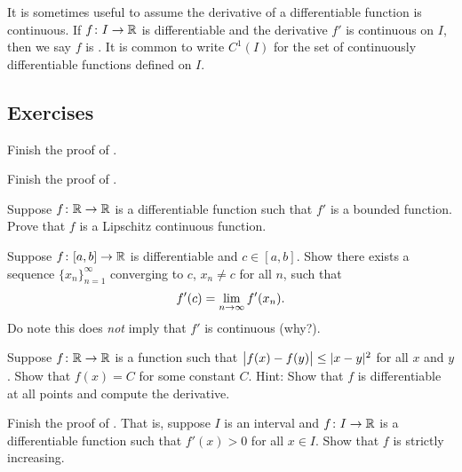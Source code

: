 It is sometimes useful to assume the derivative of a differentiable
function is continuous.  If $f \colon I \to {\mathbb{R}}$ is differentiable and
the derivative $f'$ is continuous on $I$, then we say $f$ is
\emph{}.  It is common to
write $C^1(I)$ for the set of continuously differentiable functions defined
on $I$.

\subsection{Exercises}

\begin{exercise}
Finish the proof of .
\end{exercise}

\begin{exercise}
Finish the proof of .
\end{exercise}

\begin{exercise} \label{exercise:boundeddermeanslip}
Suppose $f \colon {\mathbb{R}} \to {\mathbb{R}}$ is a differentiable
function such that $f'$ is a bounded function.  Prove
that $f$ is a Lipschitz continuous function.
\end{exercise}

\begin{exercise}
\pagebreak[1]
Suppose $f \colon [a,b] \to {\mathbb{R}}$ is differentiable and $c \in [a,b]$.
Show there exists a sequence $\{ x_n \}_{n=1}^\infty$ converging to $c$, $x_n
\neq c$ for all $n$, such that
\begin{equation*}
f'(c) = \lim_{n\to \infty} f'(x_n).
\avoidbreak
\end{equation*}
Do note this does \emph{not} imply that $f'$ is continuous (why?).
\end{exercise}

\begin{exercise}
Suppose $f \colon {\mathbb{R}} \to {\mathbb{R}}$ is a function such that
$\bigl\lvert {f(x)-f(y)} \bigr\rvert \leq \lvert {x-y} \rvert^2$ for all $x$ and $y$.  Show that
$f(x) = C$ for some constant $C$.  Hint: Show that $f$ is differentiable
at all points and compute the derivative.
\end{exercise}

\begin{exercise} \label{exercise:posderincr}
Finish the proof of .  That is,
suppose $I$ is an interval and
$f \colon I \to {\mathbb{R}}$ is a differentiable function such that
$f'(x) > 0$ for all $x \in I$.
Show that $f$ is strictly increasing.
\end{exercise}

